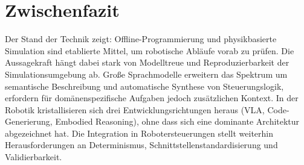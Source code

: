 \section*{Zwischenfazit}

Der Stand der Technik zeigt: Offline-Programmierung und physikbasierte
Simulation sind etablierte Mittel, um robotische Abläufe vorab zu prüfen. Die
Aussagekraft hängt dabei stark von Modelltreue und Reproduzierbarkeit der
Simulationsumgebung ab. Große Sprachmodelle erweitern das Spektrum um
semantische Beschreibung und automatische Synthese von Steuerungslogik,
erfordern für domänenspezifische Aufgaben jedoch zusätzlichen Kontext. In der
Robotik kristallisieren sich drei Entwicklungsrichtungen heraus (VLA,
Code-Generierung, Embodied Reasoning), ohne dass sich eine dominante Architektur
abgezeichnet hat. Die Integration in Robotersteuerungen stellt weiterhin
Herausforderungen an Determinismus, Schnittstellenstandardisierung und
Validierbarkeit.
